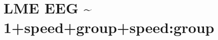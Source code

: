 \documentclass[
]{article}
\newenvironment{Shaded}{\begin{snugshade}}{\end{snugshade}}
\newcommand{\AttributeTok}[1]{\textcolor[rgb]{0.13,0.29,0.53}{#1}}
\newcommand{\FunctionTok}[1]{\textcolor[rgb]{0.13,0.29,0.53}{\textbf{#1}}}
\newcommand{\NormalTok}[1]{#1}
\newcommand{\OtherTok}[1]{\textcolor[rgb]{0.56,0.35,0.01}{#1}}
\newcommand{\SpecialCharTok}[1]{\textcolor[rgb]{0.81,0.36,0.00}{\textbf{#1}}}
\newcommand{\StringTok}[1]{\textcolor[rgb]{0.31,0.60,0.02}{#1}}
\begin{document}
\begin{Shaded}
\end{Shaded}

\hypertarget{lme-eeg-1speedgroupspeedgroup}{%
\section{LME EEG \textasciitilde{}
1+speed+group+speed:group}\label{lme-eeg-1speedgroupspeedgroup}}
\end{document}
